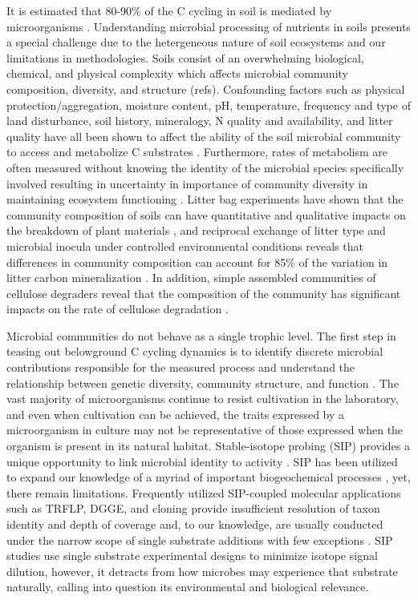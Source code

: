It is estimated that 80-90\% of the C cycling in soil is mediated by microorganisms \cite{ColemanCrossley_1996,Nannipieri_2003}. Understanding microbial processing of nutrients in soils presents a special challenge due to the hetergeneous nature of soil ecosystems and our limitations in methodologies. Soils consist of an overwhelming biological, chemical, and physical complexity which affects microbial community composition, diversity, and structure (refs). Confounding factors such as physical protection/aggregation, moisture content, pH, temperature, frequency and type of land disturbance, soil history, mineralogy, N quality and availability, and litter quality have all been shown to affect the ability of the soil microbial community to access and metabolize C substrates \cite{Schlesinger_1977,dgett_Wall_Hattenschwiler_2010,Sollins_Homann_Caldwell_1996,Torn_Vitousek_Trumbore_2005,TRUMBORE_2006,Schimel_2012}. Furthermore, rates of metabolism are often measured without knowing the identity of the microbial species specifically involved \cite{ndi_Pietramellara_Renella_2003} resulting in uncertainty in importance of community diversity in maintaining ecosystem functioning \cite{Allison_2008,ndi_Pietramellara_Renella_2003,Schimel_2012}. Litter bag experiments have shown that the community composition of soils can have quantitative and qualitative impacts on the breakdown of plant materials \cite{Schimel_1995}, and reciprocal exchange of litter type and microbial inocula under controlled environmental conditions reveals that differences in community composition can account for 85\% of the variation in litter carbon mineralization \cite{Strickland_2009}. In addition, simple assembled communities of cellulose degraders reveal that the composition of the community has significant impacts on the rate of cellulose degradation \cite{Wohl_2004}. 

Microbial communities do not behave as a single trophic level. The first step in teasing out belowground C cycling dynamics is to identify discrete microbial contributions responsible for the measured process and understand the relationship between genetic diversity, community structure, and function \cite{O_Donnell_2002}. The vast majority of microorganisms continue to resist cultivation in the laboratory, and even when cultivation can be achieved, the traits expressed by a microorganism in culture may not be representative of those expressed when the organism is present in its natural habitat. Stable-isotope probing (SIP) provides a unique opportunity to link microbial identity to activity \cite{Chen_Murrell_2010}. SIP has been utilized to expand our knowledge of a myriad of important biogeochemical processes \cite{Chen_Murrell_2010}, yet, there remain limitations. Frequently utilized SIP-coupled molecular applications such as TRFLP, DGGE, and cloning provide insufficient resolution of taxon identity and depth of coverage and, to our knowledge, are usually conducted under the narrow scope of single substrate additions with few exceptions \cite{Lueders_2003,Chauhan_2009}. SIP studies use single substrate experimental designs to minimize isotope signal dilution, however, it detracts from how microbes may experience that substrate naturally, calling into question its environmental and biological relevance.

